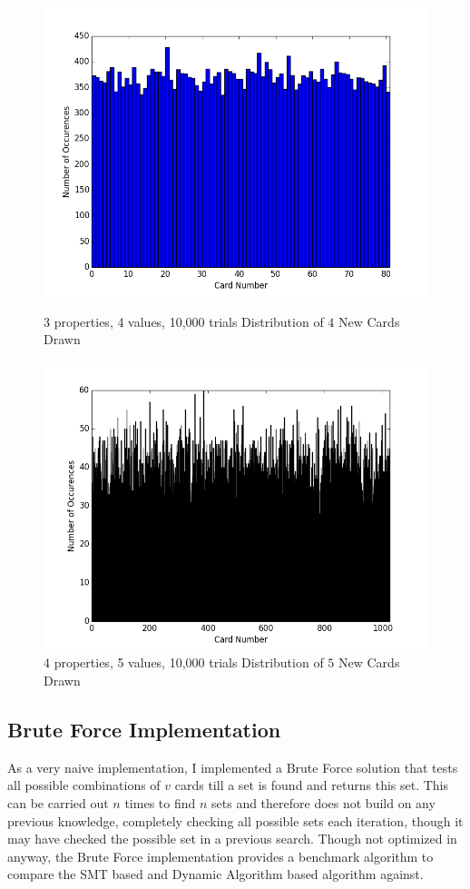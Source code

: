 \documentclass[pageno]{jpaper}
\begin{document}
\begin{figure}[htbb]
\begin{minipage}[b]{0.5\linewidth}
\centering
\includegraphics[width=.75\linewidth]{3p4v10000Draw.png}
\caption{3 properties, 4 values, 10,000 trials Distribution of $4$ New Cards Drawn}
\label{fig:draw1}
\end{minipage}
\hspace{0.5cm}
\begin{minipage}[b]{0.5\linewidth}
\centering
\includegraphics[width=.75\linewidth]{4p5v10000Draw.png}
\caption{4 properties, 5 values, 10,000 trials Distribution of $5$ New Cards Drawn}
\label{fig:draw2}
\end{minipage}
\end{figure}

\subsection{Brute Force Implementation}

As a very naive implementation, I implemented a Brute Force solution that tests all possible combinations of $v$ cards till a set is found and returns this set. This can be carried out $n$ times to find $n$ sets and therefore does not build on any previous knowledge, completely checking all possible sets each iteration, though it may have checked the possible set in a previous search. Though not optimized in anyway, the Brute Force implementation provides a benchmark algorithm to compare the SMT based and Dynamic Algorithm based algorithm against. 
\end{document}

